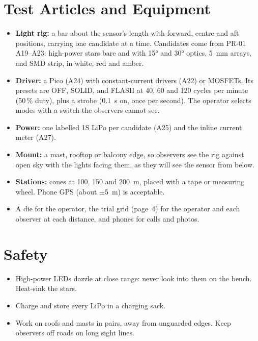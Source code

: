 \documentclass[final]{dbfdoc}
\begin{document}
\section{Test Articles and Equipment}
\begin{itemize}
\item \textbf{Light rig:} a bar about the sensor's length with forward, centre and aft positions, carrying one candidate at a time. Candidates come from PR-01 A19--A23: high-power stars bare and with 15° and 30° optics, 5~mm arrays, and SMD strip, in white, red and amber.
\item \textbf{Driver:} a Pico (A24) with constant-current drivers (A22) or MOSFETs. Its presets are OFF, SOLID, and FLASH at 40, 60 and 120 cycles per minute (50\,\% duty), plus a strobe (0.1~s on, once per second). The operator selects modes with a switch the observers cannot see.
\item \textbf{Power:} one labelled 1S LiPo per candidate (A25) and the inline current meter (A27).
\item \textbf{Mount:} a mast, rooftop or balcony edge, so observers see the rig against open sky with the lights facing them, as they will see the sensor from below.
\item \textbf{Stations:} cones at 100, 150 and 200~m, placed with a tape or measuring wheel. Phone GPS (about $\pm$5~m) is acceptable.
\item A die for the operator, the trial grid (page~4) for the operator and each observer at each distance, and phones for calls and photos.
\end{itemize}

\section{Safety}
\begin{itemize}
\item High-power LEDs dazzle at close range: never look into them on the bench. Heat-sink the stars.
\item Charge and store every LiPo in a charging sack.
\item Work on roofs and masts in pairs, away from unguarded edges. Keep observers off roads on long sight lines.
\end{itemize}
\end{document}

